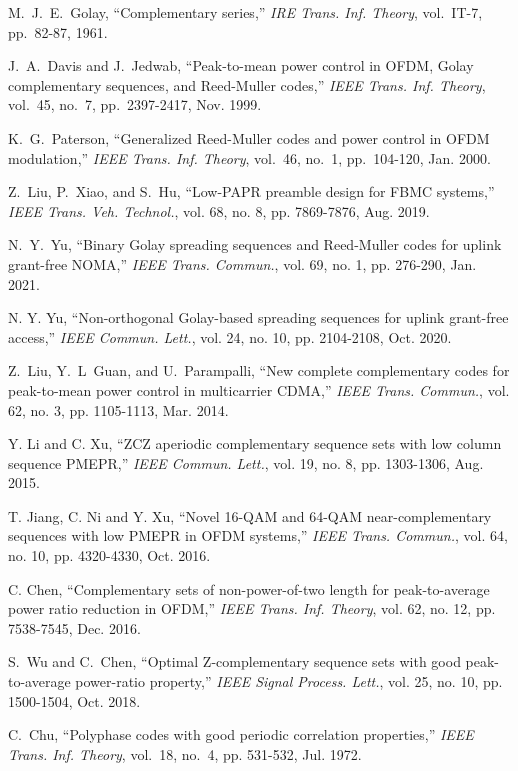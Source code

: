 \documentclass[journal]{IEEEtran}
\numberwithin{const2}{const}
\begin{document}
\begin{thebibliography}{1}
	
	M.~J.~E.~Golay,
	``Complementary series,''
	\emph{IRE Trans. Inf. Theory}, vol.~IT-7, pp.~82-87, 1961.
	
	J.~A.~Davis and J.~Jedwab,
	``Peak-to-mean power control in OFDM, Golay complementary sequences, and Reed-Muller codes,''
	\emph{IEEE Trans. Inf. Theory}, vol.~45, no.~7, pp.~2397-2417, Nov. 1999.
	
	K.~G.~Paterson,
	``Generalized Reed-Muller codes and power control in OFDM modulation,''
	\emph{IEEE Trans. Inf. Theory}, vol.~46, no.~1, pp.~104-120, Jan. 2000.
	
	Z.~Liu, P.~Xiao, and S.~Hu,
	``Low-PAPR preamble design for FBMC systems,''
	\emph{IEEE Trans. Veh. Technol.}, vol. 68, no. 8, pp. 7869-7876, Aug. 2019.
	
	N.~Y.~Yu,
	``Binary Golay spreading sequences and Reed-Muller codes for uplink grant-free NOMA,'' 
	\emph{IEEE Trans. Commun.}, vol. 69, no. 1, pp. 276-290, Jan. 2021.
	
	N. Y. Yu,
	``Non-orthogonal Golay-based spreading sequences for uplink grant-free access,''
	\emph{IEEE Commun. Lett.}, vol. 24, no. 10, pp. 2104-2108, Oct. 2020.	
	
	Z.~Liu, Y.~L~Guan, and U.~Parampalli,
	``New complete complementary codes for peak-to-mean power control in multicarrier CDMA,''
	\emph{IEEE Trans. Commun.}, vol. 62, no. 3, pp. 1105-1113, Mar. 2014.
	
	Y. Li and C. Xu, 
	``ZCZ aperiodic complementary sequence sets with low column sequence PMEPR,'' 
	\emph{IEEE Commun. Lett.}, vol. 19, no. 8, pp. 1303-1306, Aug. 2015.
	
	
	T. Jiang, C. Ni and Y. Xu, 
	``Novel 16-QAM and 64-QAM near-complementary sequences with low PMEPR in OFDM systems,''
	\emph{IEEE Trans. Commun.}, vol. 64, no. 10, pp. 4320-4330, Oct. 2016.
	
	
	C. Chen, 
	``Complementary sets of non-power-of-two length for peak-to-average power ratio reduction in OFDM,''
	\emph{IEEE Trans. Inf. Theory}, vol. 62, no. 12, pp. 7538-7545, Dec. 2016.
	
	
	S.~Wu and C.~Chen, 
	``Optimal Z-complementary sequence sets with good peak-to-average power-ratio property,''
	\emph{IEEE Signal Process. Lett.}, vol. 25, no. 10, pp. 1500-1504, Oct. 2018.
	
	C.~Chu,
	``Polyphase codes with good periodic correlation properties,''
	\emph{IEEE Trans. Inf. Theory}, vol.~18, no.~4, pp. 531-532, Jul. 1972.
	

\end{thebibliography}
\end{document}
